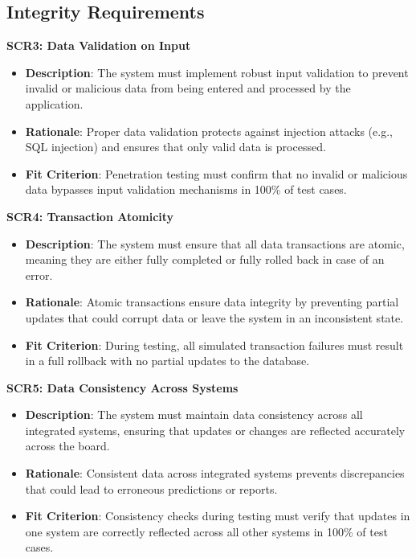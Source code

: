 \documentclass[12pt]{article}
\begin{document}
\subsection{Integrity Requirements}
\textbf{SCR3: Data Validation on Input}
\begin{itemize}
    \item \textbf{Description}: The system must implement robust input
    validation to prevent invalid or malicious data from being entered and
    processed by the application.
    \item \textbf{Rationale}: Proper data validation protects against injection
    attacks (e.g., SQL injection) and ensures that only valid data is processed.
    \item \textbf{Fit Criterion}: Penetration testing must confirm that no
    invalid or malicious data bypasses input validation mechanisms in 100\% of
    test cases.
\end{itemize}
\textbf{SCR4: Transaction Atomicity}
\begin{itemize}
    \item \textbf{Description}: The system must ensure that all data
    transactions are atomic, meaning they are either fully completed or fully
    rolled back in case of an error.
    \item \textbf{Rationale}: Atomic transactions ensure data integrity by
    preventing partial updates that could corrupt data or leave the system in an
    inconsistent state.
    \item \textbf{Fit Criterion}: During testing, all simulated transaction
    failures must result in a full rollback with no partial updates to the
    database.
\end{itemize}
\textbf{SCR5: Data Consistency Across Systems}
\begin{itemize}
    \item \textbf{Description}: The system must maintain data consistency across
    all integrated systems, ensuring that updates or changes are reflected
    accurately across the board.
    \item \textbf{Rationale}: Consistent data across integrated systems prevents
    discrepancies that could lead to erroneous predictions or reports.
    \item \textbf{Fit Criterion}: Consistency checks during testing must verify
    that updates in one system are correctly reflected across all other systems
    in 100\% of test cases.
\end{itemize}
\end{document}
